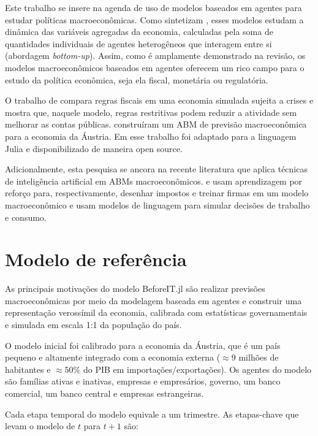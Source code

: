 \documentclass[12pt,a4paper]{article}
\begin{document}
Este trabalho se insere na agenda de uso de modelos baseados em agentes para estudar políticas macroeconômicas. Como sintetizam \citet{dawid2018}, esses modelos estudam a dinâmica das variáveis agregadas da economia, calculadas pela soma de quantidades individuais de agentes heterogêneos que interagem entre si (abordagem \emph{bottom-up}). Assim, como é amplamente demonstrado na revisão, os modelos macroeconômicos baseados em agentes oferecem um rico campo para o estudo da política econômica, seja ela fiscal, monetária ou regulatória.

O trabalho de \citet{dosi2015} compara regras fiscais em uma economia simulada sujeita a crises e mostra que, naquele modelo, regras restritivas podem reduzir a atividade sem melhorar as contas públicas. \citet{poledna2023} construíram um ABM de previsão macroeconômica para a economia da Áustria. Em \citet{glielmo2025} esse trabalho foi adaptado para a linguagem Julia e disponibilizado de maneira open source.

Adicionalmente, esta pesquisa se ancora na recente literatura que aplica técnicas de inteligência artificial em ABMs macroeconômicos. \citet{zheng2022} e \citet{brusatin2024} usam aprendizagem por reforço para, respectivamente, desenhar impostos e treinar firmas em um modelo macroeconômico e \citet{li2024} usam modelos de linguagem para simular decisões de trabalho e consumo.

\section{Modelo de referência}

As principais motivações do modelo BeforeIT.jl são realizar previsões macroeconômicas por meio da modelagem baseada em agentes e construir uma representação verossímil da economia, calibrada com estatísticas governamentais e simulada em escala 1:1 da população do país.

O modelo inicial foi calibrado para a economia da Áustria, que é um país pequeno e altamente integrado com a economia externa (\(\approx 9\) milhões de habitantes e \(\approx 50\%\) do PIB em importações/exportações). Os agentes do modelo são famílias ativas e inativas, empresas e empresários, governo, um banco comercial, um banco central e empresas estrangeiras.

Cada etapa temporal do modelo equivale a um trimestre. As etapas-chave que levam o modelo de $t$ para $t+1$ são:
\end{document}

